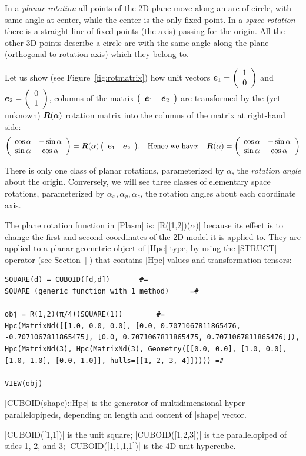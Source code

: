 In a \emph{planar rotation} all points of the 2D plane move along an arc of circle, with same angle at center, while the center is the only fixed point. In  a \emph{space rotation} there is a straight line of fixed points (the axis) passing for the origin. All the other 3D points describe a circle arc with the same angle along the plane (orthogonal to rotation axis) which they belong to. 

Let us show (see Figure~\ref{fig:rotmatrix}) how unit vectors ${\mbox{\boldmath $e$}}_1 = {\left(\begin{array}{cccccccc}1 \\ 0\end{array}\right)}$ and ${\mbox{\boldmath $e$}}_2 = {\left(\begin{array}{cccccccc}0 \\ 1\end{array}\right)}$, columns of the matrix ${\left(\begin{array}{cccccccc}{\mbox{\boldmath $e$}}_1 & {\mbox{\boldmath $e$}}_2 \end{array}\right)} $ are transformed by the (yet unknown) ${\mbox{\boldmath $R$}}(\alpha)$ rotation matrix into the columns of the matrix at right-hand side:
\[
{\left(\begin{array}{cccccccc}\cos\alpha & -\sin\alpha\\ \sin\alpha & \cos\alpha\end{array}\right)}
=
{\mbox{\boldmath $R$}}(\alpha)\,{\left(\begin{array}{cccccccc}{\mbox{\boldmath $e$}}_1 & {\mbox{\boldmath $e$}}_2 \end{array}\right)}. 
\quad
\mbox{Hence we have:}
\quad
{\mbox{\boldmath $R$}}(\alpha) = {\left(\begin{array}{cccccccc}\cos\alpha & -\sin\alpha\\ \sin\alpha & \cos\alpha\end{array}\right)}
\]


There is only one class of planar rotations, parameterized by $\alpha$, the \emph{rotation angle} about the origin. Conversely, we will see three classes of elementary space rotations, parameterized by $\alpha_x, \alpha_y, \alpha_z$, the rotation angles about each coordinate axis.


\begin{coding}
The plane rotation function in |Plasm| is: |R([1,2])($\alpha$)| because its effect is to change the first and second coordinates of the 2D model it is applied to. They are applied to a planar geometric object of |Hpc| type, by using the |STRUCT| operator (see Section~\ref{}) that contains |Hpc| values and transformation tensors:
\begin{lstlisting}[language=JuliaLocal, style=julia, mathescape=true]
SQUARE(d) = CUBOID([d,d])		#=
SQUARE (generic function with 1 method)		=#

obj = R(1,2)(π/4)(SQUARE(1))		#=
Hpc(MatrixNd([[1.0, 0.0, 0.0], [0.0, 0.7071067811865476, -0.7071067811865475], [0.0, 0.7071067811865475, 0.7071067811865476]]), Hpc(MatrixNd(3), Hpc(MatrixNd(3), Geometry([[0.0, 0.0], [1.0, 0.0], [1.0, 1.0], [0.0, 1.0]], hulls=[[1, 2, 3, 4]])))) =#

VIEW(obj)
\end{lstlisting}
\end{coding}

\begin{remark}
|CUBOID(shape)::Hpc| is the generator of multidimensional hyper-par\-allelo\-pipeds, depending on length and content of |shape| vector. 

|CUBOID([1,1])| is the unit square;  |CUBOID([1,2,3])| is the parallelopiped of sides 1, 2, and 3; 
|CUBOID([1,1,1,1])| is the 4D unit hypercube.
\end{remark}


